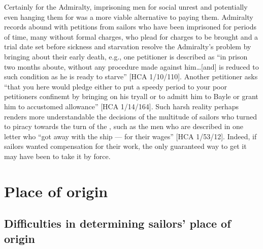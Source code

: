 Certainly for the Admiralty, imprisoning men for social unrest and potentially even hanging them for  was a more viable alternative to paying them. Admiralty records abound with petitions from sailors who have been imprisoned for  periods of time, many without formal charges, who plead for charges to be brought and a trial date set before sickness and starvation resolve the Admiralty’s problem by bringing about their early death, e.g., one petitioner is described as “in prison two months aboute, without any procedure made against him…[and] is reduced to such condition as he is ready to starve” [HCA 1/10/110]. Another petitioner asks “that you here would pledge either to put a speedy period to your poor petitioners confinemt by bringing on his tryall or to admitt him to Bayle or grant him to accustomed allowance” [HCA 1/14/164]. Such harsh reality perhaps renders more understandable the decisions of the multitude of sailors who turned to piracy towards the turn of the , such as the men who are described in one letter who “got away with the ship — for their wages” [HCA 1/53/12]. Indeed, if sailors wanted compensation for their work, the only guaranteed way to get it may have been to take it by force. 

\section{{Place of origin} }\label{sec:3.9}


\subsection{{Difficulties in determining sailors' place of origin}}\label{sec:3.9.1}


